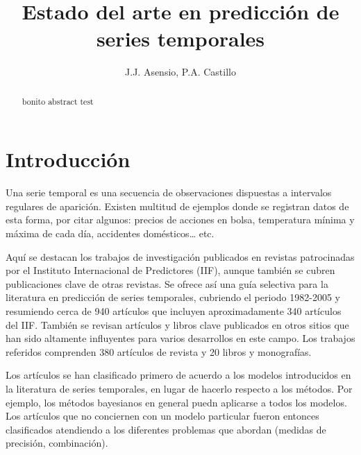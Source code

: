 \documentclass{llncs}
\begin{document}

\title{Estado del arte en predicción de series temporales}


\author{J.J. Asensio, P.A. Castillo}


\maketitle
%
%
\begin{abstract} 
bonito abstract test
\end{abstract}


%
%
\section{Introducción}
\label{sec:intro}
Una serie temporal es una secuencia de observaciones dispuestas a intervalos regulares de aparición. Existen multitud de ejemplos donde se registran datos de esta forma, por citar algunos: precios de acciones en bolsa, temperatura mínima y máxima de cada día, accidentes domésticos… etc.

Aquí se destacan los trabajos de investigación publicados en revistas patrocinadas por el Instituto Internacional de Predictores (IIF), aunque también se cubren publicaciones clave de otras revistas. Se ofrece así una guía selectiva para la literatura en predicción de series temporales, cubriendo el periodo 1982-2005 y resumiendo cerca de 940 artículos que incluyen aproximadamente 340 artículos del IIF. También se revisan artículos y libros clave publicados en otros sitios que han sido altamente influyentes para varios desarrollos en este campo. Los trabajos referidos comprenden 380 artículos de revista y 20 libros y monografías. 

Los artículos se han clasificado primero de acuerdo a los modelos introducidos en la literatura de series temporales, en lugar de hacerlo respecto a los métodos. Por ejemplo, los métodos bayesianos en general puedn aplicarse a todos los modelos. Los artículos que no conciernen con un modelo particular fueron entonces clasificados atendiendo a los diferentes problemas que abordan (medidas de precisión, combinación). 
\end{document}
